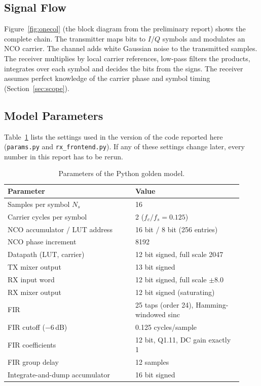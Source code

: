 \documentclass[10pt,twocolumn,letterpaper]{article}
\begin{document}
\subsection{Signal Flow}

Figure~\ref{fig:onecol} (the block diagram from the preliminary report) shows the complete chain. The transmitter maps bits to
$I/Q$ symbols and modulates an NCO carrier. The channel adds white Gaussian
noise to the transmitted samples. The receiver multiplies by local carrier
references, low-pass filters the products, integrates over each symbol and
decides the bits from the signs. The receiver assumes perfect knowledge of the
carrier phase and symbol timing (Section~\ref{sec:scope}).

\subsection{Model Parameters}

Table~\ref{tab:params} lists the settings used in the version of the code
reported here (\texttt{params.py} and \texttt{rx\_frontend.py}). If any of
these settings change later, every number in this report has to be rerun.

\begin{table}[H]
\centering\color{blue}\small
\begin{tabular}{@{}p{0.50\linewidth}p{0.42\linewidth}@{}}
\toprule
Parameter & Value \\
\midrule
Samples per symbol $N_s$ & 16 \\
Carrier cycles per symbol & 2 ($f_c/f_s = 0.125$) \\
NCO accumulator / LUT address & 16 bit / 8 bit (256 entries) \\
NCO phase increment & 8192 \\
Datapath (LUT, carrier) & 12 bit signed, full scale 2047 \\
TX mixer output & 13 bit signed \\
RX input word & 12 bit signed, full scale $\pm 8.0$ \\
RX mixer output & 12 bit signed (saturating) \\
FIR & 25 taps (order 24), Hamming-windowed sinc \\
FIR cutoff ($-6$\,dB) & 0.125 cycles/sample \\
FIR coefficients & 12 bit, Q1.11, DC gain exactly 1 \\
FIR group delay & 12 samples \\
Integrate-and-dump accumulator & 16 bit signed \\
\bottomrule
\end{tabular}
\caption{Parameters of the Python golden model.}
\label{tab:params}
\end{table}
\end{document}
